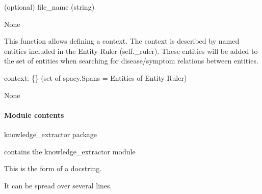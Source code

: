 \documentclass[letterpaper,10pt,english]{sphinxmanual}
\begin{document}
\begin{fulllineitems}
\begin{fulllineitems}
\sphinxAtStartPar
(optional) file\_name (string)

\sphinxAtStartPar
None

\end{fulllineitems}


\begin{fulllineitems}
\label{\detokenize{medextractor.knowledge_extractor:medextractor.knowledge_extractor.knowledge_extractor.KnowledgeExtractor.set_context}}
\pysigstartsignatures
{}
\pysigstopsignatures
\sphinxAtStartPar
This function allows defining a context. The context is described by
named entities included in the Entity Ruler (self.\_ruler). These entities will
be added to the set of entities when searching for disease/symptom relations
between entities.

\sphinxAtStartPar
context: \{\} (set of spacy.Spans = Entities of Entity Ruler)

\sphinxAtStartPar
None

\end{fulllineitems}


\end{fulllineitems}



\paragraph{Module contents}
\label{\detokenize{medextractor.knowledge_extractor:module-medextractor.knowledge_extractor}}\label{\detokenize{medextractor.knowledge_extractor:module-contents}}
\sphinxAtStartPar
knowledge\_extractor package

\sphinxAtStartPar
contains the knowledge\_extractor module

\sphinxAtStartPar
This is the form of a docstring.

\sphinxAtStartPar
It can be spread over several lines.

\sphinxstepscope
\end{document}

